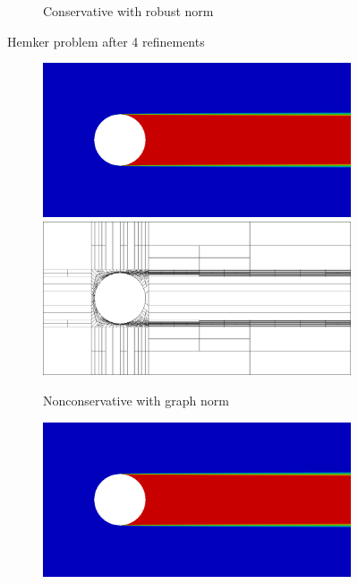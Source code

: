 \documentclass[letterpaper]{article}
\begin{document}
\begin{figure}
\begin{subfigure}[t]{0.45\textwidth}
\caption{Conservative with robust norm}
\label{fig:hemkerRobust4c}
\end{subfigure}
\caption{Hemker problem after 4 refinements}
\label{fig:hemker4}
\end{figure}

\begin{figure}
\centering
\begin{subfigure}[t]{0.45\textwidth}
\centering
\includegraphics[width=\textwidth]{figs/Hemker/graph8nc.png}
\includegraphics[width=\textwidth]{figs/Hemker/graph8nc_mesh.png}
\caption{Nonconservative with graph norm}
\label{fig:hemkerGraph8nc}
\end{subfigure}
\begin{subfigure}[t]{0.45\textwidth}
\centering
\includegraphics[width=\textwidth]{figs/Hemker/robust8nc.png}

\end{subfigure}
\end{figure}
\end{document}

